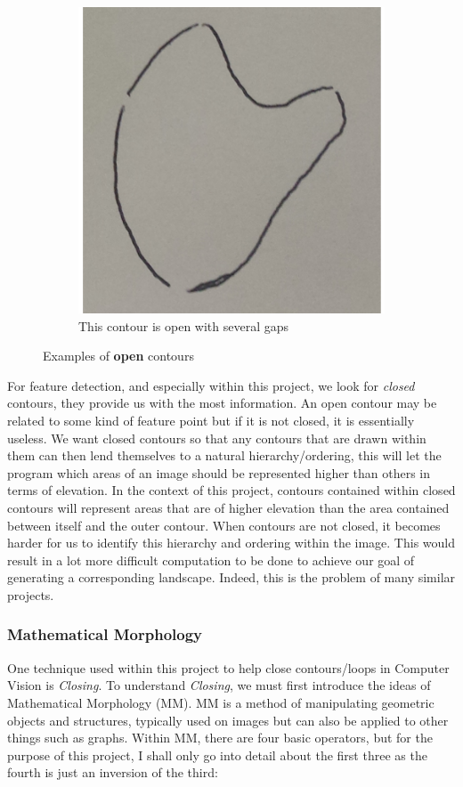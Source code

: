 \documentclass[11pt]{article}
\begin{document}
\begin{figure}[H]
\begin{subfigure}[t]{.3\textwidth}
		\centering
		\includegraphics[scale=0.3]{pics/openloop3.png}
		\caption{This contour is open with several gaps}
	\end{subfigure}
	\caption{Examples of \textbf{open} contours}
	\label{fig:opencontours}
\end{figure}

For feature detection, and especially within this project, we look for 
\textit{closed} contours, they provide us with the most information. An open
contour may be related to some kind of feature point but if it is not closed,
it is essentially useless. We want closed contours so that any
contours that are drawn within them can then lend themselves to a natural
hierarchy/ordering, this will let the program which areas of an image
should be represented higher than others in terms of elevation. 
In the context of this project, contours contained within closed contours
will represent areas that are of higher elevation than the area contained between
itself and the outer contour. When contours are not closed, it becomes harder
for us to identify this hierarchy and ordering within the image. This
would result in a lot more difficult computation to be done to achieve
our goal of generating a corresponding landscape. Indeed, this is the problem of
many similar projects.

\subsubsection{Mathematical Morphology}
One technique used within this project 
to help close contours/loops in Computer Vision is \textit{Closing}.
To understand \textit{Closing}, we must first introduce the ideas of 
Mathematical Morphology (MM). MM is a method of manipulating geometric objects
and structures, typically used on images but can also be applied to other things
such as graphs. Within MM, there are four basic operators, but for the purpose
of this project, I shall only go into detail about the first three as 
the fourth is just an inversion of the third:
\end{document}
